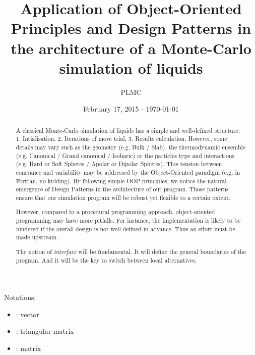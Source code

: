 \documentclass[a4paper, 12pt]{article}
\title{Application of Object-Oriented Principles and Design Patterns in the architecture of
    a Monte-Carlo simulation of liquids}
\author{PLMC}
\date{February 17, 2015 - \today{}}
\def\buildMode{buildmissing}
\begin{document}
    \maketitle

    \begin{abstract}
        A classical Monte-Carlo simulation of liquids has a simple and well-defined structure:
        1. Intialisation, 2. Iterations of move trial, 3. Results calculation.
        However, some details may vary such as the geometry (e.g. Bulk / Slab),
        the thermodynamic ensemble (e.g. Canonical / Grand canonical / Isobaric)
        or the particles type and interactions (e.g. Hard or Soft Spheres /
        Apolar or Dipolar Spheres).
        This tension between constance and variability may be addressed by
        the Object-Oriented paradigm (e.g. in Fortran, no kidding).
        By following simple OOP principles, we notice the natural emergence of Design Patterns
        in the architecture of our program.
        Those patterns ensure that our simulation program will be robust yet flexible
        to a certain extent.

        However, compared to a procedural programming approach, object-oriented programming
        may have more pitfalls.
        For instance, the implementation is likely to be hindered if the overall design is
        not well-defined in advance. Thus an effort must be made upstream.

        The notion of \emph{interface} will be fundamental. It will define the general boundaries of
        the program. And it will be the key to switch between local alternatives.
    \end{abstract}

    Notations:
    \begin{itemize}
        \item {}: vector
        \item {}: triangular matrix
        \item {}: matrix
    \end{itemize}

    \begin{landscape}
        \begin{figure}[htb]
            \centering
            
            \caption{}
        \end{figure}
    \end{landscape}
\end{document}
